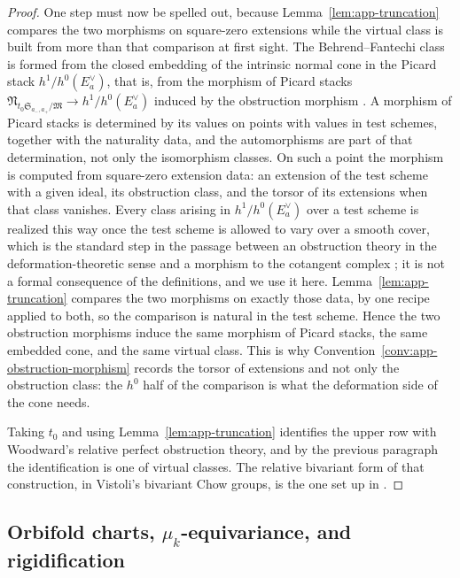 \begin{proof}
One step must now be spelled out, because Lemma~\ref{lem:app-truncation}
compares the two morphisms on square-zero extensions while the virtual class is
built from more than that comparison at first sight.  The Behrend--Fantechi
class is
formed from the closed embedding of the intrinsic normal cone in the Picard
stack \(h^1/h^0(E_a^\vee)\), that is, from the morphism of Picard stacks
\(\mathfrak N_{t_0\mathfrak S_{a_-,a_+}/\mathfrak M}\to h^1/h^0(E_a^\vee)\)
induced by the obstruction morphism \cite{BehrendFantechi}.  A morphism of
Picard stacks is determined by its values on points with values in test
schemes, together with the naturality data, and the automorphisms are part of
that determination, not only the isomorphism classes.  On such a point the
morphism is computed from square-zero extension data: an extension of the test
scheme with a given ideal, its obstruction class, and the torsor of its
extensions when that class vanishes.  Every class arising in
\(h^1/h^0(E_a^\vee)\) over a test scheme is realized this way once the test
scheme is allowed to vary over a smooth cover, which is the standard step in
the passage between an obstruction theory in the deformation-theoretic sense
and a morphism to the cotangent complex \cite[Section~4]{BehrendFantechi}; it
is not a formal consequence of the definitions, and we use it here.
Lemma~\ref{lem:app-truncation} compares the two morphisms on exactly those
data, by one recipe applied to both, so the comparison is natural in the test
scheme.  Hence the two obstruction morphisms induce
the same morphism of Picard stacks, the same embedded cone, and the same
virtual class.  This is why
Convention~\ref{conv:app-obstruction-morphism} records the torsor of
extensions and not only the obstruction class: the \(h^0\) half of the
comparison is what the deformation side of the cone needs.

Taking \(t_0\) and using
Lemma~\ref{lem:app-truncation} identifies the upper row with Woodward's
relative perfect obstruction theory, and by the previous paragraph the
identification is one of virtual classes.
The relative bivariant form of that construction, in
Vistoli's bivariant Chow groups, is the one set up in
\cite[Section~6]{WoodwardQKII}.
\end{proof}

\subsection{Orbifold charts, \texorpdfstring{\(\mu_k\)}{mu-k}-equivariance, and
rigidification}
\label{app:rigidification}


